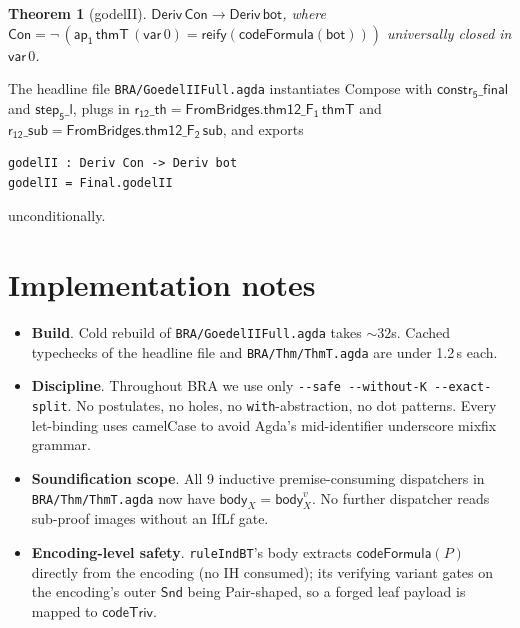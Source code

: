 \documentclass[11pt]{article}
\newtheorem{theorem}{Theorem}
\newcommand{\Deriv}{\mathsf{Deriv}}
\newcommand{\thmT}{\mathsf{thmT}}
\newcommand{\Con}{\mathsf{Con}}
\newcommand{\bot}{\mathsf{bot}}
\newcommand{\Snd}{\mathsf{Snd}}
\newcommand{\reify}{\mathsf{reify}}
\newcommand{\codeFormula}{\mathsf{codeFormula}}
\newcommand{\codeTriv}{\mathsf{codeTriv}}
\begin{document}
\begin{theorem}[godelII]
\label{thm:godelII}
$\Deriv\,\Con \to \Deriv\,\bot$,
where $\Con = \neg\,(\mathsf{ap_1}\,\thmT\,(\mathsf{var}\,0) =
\reify(\codeFormula(\bot)))$ universally closed in $\mathsf{var}\,0$.
\end{theorem}

The headline file \verb|BRA/GoedelIIFull.agda| instantiates Compose with
$\mathsf{constr_5\_final}$ and $\mathsf{step_5\_l}$, plugs in
$\mathsf{r_{12}\_th} = \mathsf{FromBridges.thm12\_F_1}\,\thmT$ and
$\mathsf{r_{12}\_sub} = \mathsf{FromBridges.thm12\_F_2}\,\mathsf{sub}$,
and exports

\begin{verbatim}
godelII : Deriv Con -> Deriv bot
godelII = Final.godelII
\end{verbatim}

unconditionally.

\section{Implementation notes}

\begin{itemize}
\item \textbf{Build}.  Cold rebuild of \verb|BRA/GoedelIIFull.agda|
  takes \(\sim\!32\)s.  Cached typechecks of the headline file and
  \verb|BRA/Thm/ThmT.agda| are under 1.2\,s each.

\item \textbf{Discipline}.  Throughout BRA we use only
  \verb|--safe --without-K --exact-split|.  No postulates, no holes,
  no \verb|with|-abstraction, no dot patterns.  Every let-binding uses
  camelCase to avoid Agda's mid-identifier underscore mixfix grammar.

\item \textbf{Soundification scope}.  All 9 inductive
  premise-consuming dispatchers in \verb|BRA/Thm/ThmT.agda| now have
  $\mathsf{body}_X = \mathsf{body}_X^v$.  No further dispatcher reads
  sub-proof images without an IfLf gate.

\item \textbf{Encoding-level safety}.  \verb|ruleIndBT|'s body extracts
  $\codeFormula(P)$ directly from the encoding (no IH consumed); its
  verifying variant gates on the encoding's outer $\Snd$ being
  Pair-shaped, so a forged leaf payload is mapped to $\codeTriv$.
\end{itemize}
\end{document}
